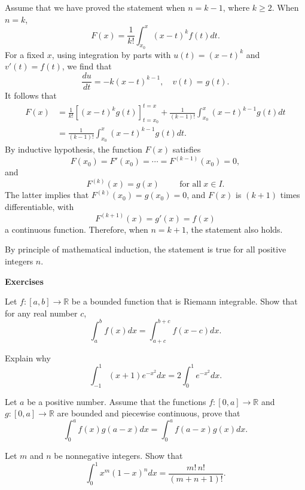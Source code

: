 \begin{example}[label=20230527]{}
\begin{solution}
Assume that we have proved the statement when $n=k-1$, where $k\geq 2$. When $n=k$, 
\[F(x)=\frac{1}{k!}\int_{x_0}^x(x-t)^kf(t)dt.\]
  For a fixed $x$, using integration by parts with $u(t)=(x-t)^k$ and $v'(t)=f(t)$, we find that 
\[\frac{du}{dt}=-k(x-t)^{k-1}, \quad v(t)=g(t).\] 
It follows that
\begin{align*}F(x)&=\frac{1}{k!}\left[(x-t)^kg(t)\right]_{t=x_0}^{t=x}+\frac{1}{(k-1)!}\int_{x_0}^x (x-t)^{k-1}g(t)dt\\&=\frac{1}{(k-1)!}\int_{x_0}^x (x-t)^{k-1}g(t)dt.\end{align*}
By inductive hypothesis, the function
$F(x)$ satisfies 
\[F(x_0)=F'(x_0)=\cdots=F^{(k-1)}(x_0)=0,\]\bs
and
\[F^{(k)}(x)=g(x)\hspace{1cm}\text{for all}\;x\in I.\] 
The latter implies that $F^{(k)}(x_0)=g(x_0)=0$, and $F(x)$ is $(k+1)$ times differentiable, with
\[F^{(k+1)}(x)=g'(x)=f(x) \] a continuous function. Therefore, when $n=k+1$, the statement also holds. 


By principle of mathematical induction, the statement is true for all positive integers $n$.
\end{solution}

\vp
\noindent
{\bf \large Exercises  \thesection}
\setcounter{myquestion}{1}
\atc
\begin{question}{\themyquestion}Let $f:[a,b]\to\mathbb{R}$ be a bounded function that is Riemann integrable.
Show that for any real number $c$,
\[\int_a^bf(x)dx=\int_{a+c}^{b+c}f(x-c)dx.\]
\end{question}
\begin{question}{\themyquestion}
Explain why  
\[\int_{-1}^1 (x+1)e^{-x^2}dx=2\int_0^1e^{-x^2}dx.\]
\end{question}
 
\atc
\begin{question}{\themyquestion}
 Let $a$ be a positive number. Assume that the functions $f:[0,a]\to\mathbb{R}$ and $g:[0,a]\to\mathbb{R}$ are bounded and piecewise continuous, prove that
\[\int_0^af(x)g(a-x)dx=\int_0^af(a-x)g(x)dx.\]
\end{question}
 \atc
\begin{question}[label=ex230225_1]{\themyquestion}
 Let $m$ and $n$ be nonnegative integers. Show that
\[\int_0^1x^m(1-x)^ndx=\frac{m!\,n!}{(m+n+1)!}.\]
\end{question}


\end{example}
